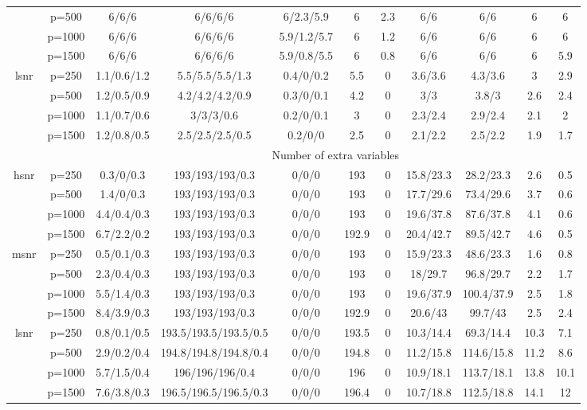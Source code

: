 \begin{table}[ht]
{\begin{tabular}{|c|c|ccccccccc|}
   & p=500 & 6/6/6 & 6/6/6/6 & 6/2.3/5.9 & 6 & 2.3 & 6/6 & 6/6 & 6 & 6 \\ 
   & p=1000 & 6/6/6 & 6/6/6/6 & 5.9/1.2/5.7 & 6 & 1.2 & 6/6 & 6/6 & 6 & 6 \\ 
   & p=1500 & 6/6/6 & 6/6/6/6 & 5.9/0.8/5.5 & 6 & 0.8 & 6/6 & 6/6 & 6 & 5.9 \\ 
  \midrule\multirow{4}[2]{*}{lsnr} & p=250 & 1.1/0.6/1.2 & 5.5/5.5/5.5/1.3 & 0.4/0/0.2 & 5.5 & 0 & 3.6/3.6 & 4.3/3.6 & 3 & 2.9 \\ 
   & p=500 & 1.2/0.5/0.9 & 4.2/4.2/4.2/0.9 & 0.3/0/0.1 & 4.2 & 0 & 3/3 & 3.8/3 & 2.6 & 2.4 \\ 
   & p=1000 & 1.1/0.7/0.6 & 3/3/3/0.6 & 0.2/0/0.1 & 3 & 0 & 2.3/2.4 & 2.9/2.4 & 2.1 & 2 \\ 
   & p=1500 & 1.2/0.8/0.5 & 2.5/2.5/2.5/0.5 & 0.2/0/0 & 2.5 & 0 & 2.1/2.2 & 2.5/2.2 & 1.9 & 1.7 \\ 
   \midrule 
 \multicolumn{1}{|c}{} &       & \multicolumn{9}{c|}{Number of extra variables} \\
\midrule\multirow{4}[2]{*}{hsnr} & p=250 & 0.3/0/0.3 & 193/193/193/0.3 & 0/0/0 & 193 & 0 & 15.8/23.3 & 28.2/23.3 & 2.6 & 0.5 \\ 
   & p=500 & 1.4/0/0.3 & 193/193/193/0.3 & 0/0/0 & 193 & 0 & 17.7/29.6 & 73.4/29.6 & 3.7 & 0.6 \\ 
   & p=1000 & 4.4/0.4/0.3 & 193/193/193/0.3 & 0/0/0 & 193 & 0 & 19.6/37.8 & 87.6/37.8 & 4.1 & 0.6 \\ 
   & p=1500 & 6.7/2.2/0.2 & 193/193/193/0.3 & 0/0/0 & 192.9 & 0 & 20.4/42.7 & 89.5/42.7 & 4.6 & 0.5 \\ 
  \midrule\multirow{4}[2]{*}{msnr} & p=250 & 0.5/0.1/0.3 & 193/193/193/0.3 & 0/0/0 & 193 & 0 & 15.9/23.3 & 48.6/23.3 & 1.6 & 0.8 \\ 
   & p=500 & 2.3/0.4/0.3 & 193/193/193/0.3 & 0/0/0 & 193 & 0 & 18/29.7 & 96.8/29.7 & 2.2 & 1.7 \\ 
   & p=1000 & 5.5/1.4/0.3 & 193/193/193/0.3 & 0/0/0 & 193 & 0 & 19.6/37.9 & 100.4/37.9 & 2.5 & 1.8 \\ 
   & p=1500 & 8.4/3.9/0.3 & 193/193/193/0.3 & 0/0/0 & 192.9 & 0 & 20.6/43 & 99.7/43 & 2.5 & 2.4 \\ 
  \midrule\multirow{4}[2]{*}{lsnr} & p=250 & 0.8/0.1/0.5 & 193.5/193.5/193.5/0.5 & 0/0/0 & 193.5 & 0 & 10.3/14.4 & 69.3/14.4 & 10.3 & 7.1 \\ 
   & p=500 & 2.9/0.2/0.4 & 194.8/194.8/194.8/0.4 & 0/0/0 & 194.8 & 0 & 11.2/15.8 & 114.6/15.8 & 11.2 & 8.6 \\ 
   & p=1000 & 5.7/1.5/0.4 & 196/196/196/0.4 & 0/0/0 & 196 & 0 & 10.9/18.1 & 113.7/18.1 & 13.8 & 10.1 \\ 
   & p=1500 & 7.6/3.8/0.3 & 196.5/196.5/196.5/0.3 & 0/0/0 & 196.4 & 0 & 10.7/18.8 & 112.5/18.8 & 14.1 & 12 \\ 
   \bottomrule 
\end{tabular}
}
\end{table}
